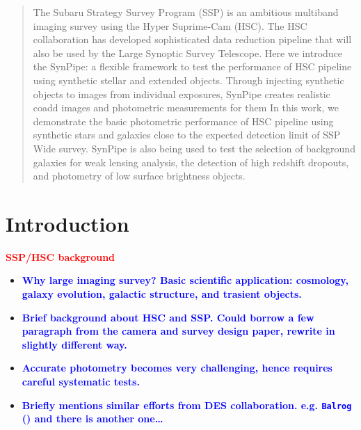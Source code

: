 \documentclass{pasj01}
\newcommand{\plan}[1]{\textcolor{blue} {\textbf{#1}}}
\newcommand{\todo}[1]{\textcolor{red} {\textbf{#1}}}
\begin{document}
\begin{abstract}
    The Subaru Strategy Survey Program (SSP) is an ambitious multiband imaging
          survey using the Hyper Suprime-Cam (HSC).
          The HSC collaboration has developed sophisticated data reduction pipeline
          that will also be used by the Large Synoptic Survey Telescope. 
          Here we introduce the SynPipe: a flexible framework to test the performance 
          of HSC pipeline using synthetic stellar and extended objects. 
          Through injecting synthetic objects to images from individual exposures, 
          SynPipe creates realistic coadd images and photometric measurements for them
          In this work, we demonstrate the basic photometric performance of HSC pipeline
          using synthetic stars and galaxies close to the expected detection limit of 
          SSP Wide survey. 
          SynPipe is also being used to test the selection of background galaxies for 
          weak lensing analysis, the detection of high redshift dropouts, and photometry 
          of low surface brightness objects.
\end{abstract}


\section{Introduction}
    \label{sec:intro}
      
    \todo{SSP/HSC background \citealt{Suchyta2016}}
    \begin{itemize}
        \item \plan{Why large imaging survey? Basic scientific application: cosmology, 
                    galaxy evolution, galactic structure, and trasient objects.} 
        \item \plan{Brief background about HSC and SSP. 
                    Could borrow a few paragraph from the camera and survey design paper, 
                    rewrite in slightly different way.}
        \item \plan{Accurate photometry becomes very challenging, hence requires careful 
                    systematic tests.}
        \item \plan{Briefly mentions similar efforts from DES collaboration. e.g. 
                    \texttt{Balrog} (\citep{Suchyta2016}) and there is another one\ldots}
    \end{itemize}
\end{document}

